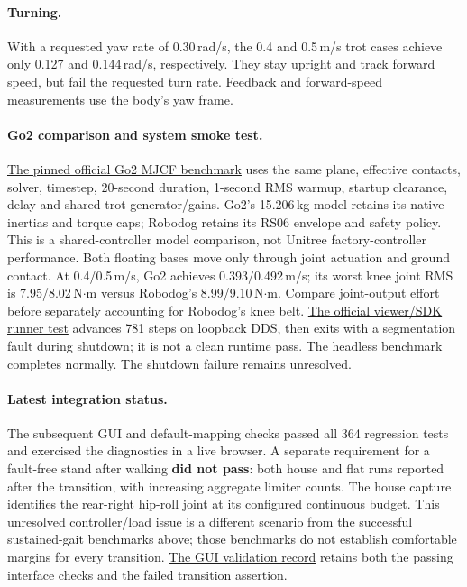 \documentclass[11pt,a4paper]{article}
\begin{document}
\paragraph{Turning.} With a requested yaw rate of 0.30\,rad/s, the 0.4 and
0.5\,m/s trot cases achieve only 0.127 and 0.144\,rad/s, respectively.
They stay upright and track forward speed, but fail the requested turn rate.
Feedback and forward-speed measurements use the body's yaw frame.

\paragraph{Go2 comparison and system smoke test.}
\href{go2_benchmark.md}{The pinned official Go2 MJCF benchmark} uses the same
plane, effective contacts, solver, timestep, 20-second duration, 1-second RMS
warmup, startup clearance, delay and shared trot generator/gains. Go2's
15.206\,kg model retains its native inertias and torque caps; Robodog retains
its RS06 envelope and safety policy. This is a shared-controller model
comparison, not Unitree factory-controller performance. Both floating bases
move only through joint actuation and ground contact. At 0.4/0.5\,m/s,
Go2 achieves 0.393/0.492\,m/s; its worst knee joint RMS is 7.95/8.02\,N$\cdot$m
versus Robodog's 8.99/9.10\,N$\cdot$m. Compare joint-output effort before
separately accounting for Robodog's knee belt.
\href{go2_runner_smoke.md}{The official viewer/SDK runner test} advances
781 steps on loopback DDS, then exits with a segmentation fault during
shutdown; it is not a clean runtime pass. The headless benchmark completes
normally. The shutdown failure remains unresolved.

\paragraph{Latest integration status.} The subsequent GUI and default-mapping
checks passed all 364 regression tests and exercised the diagnostics in a live
browser. A separate requirement for a fault-free stand after walking
\textbf{did not pass}: both house and flat runs reported
 after the transition, with increasing aggregate limiter
counts. The house capture identifies the rear-right hip-roll joint at its
configured continuous budget. This unresolved controller/load issue is a
different scenario from the successful sustained-gait benchmarks above;
those benchmarks do not establish comfortable margins for every transition.
\href{gui_telemetry_validation.json}{The GUI validation record} retains both
the passing interface checks and the failed transition assertion.
\end{document}
